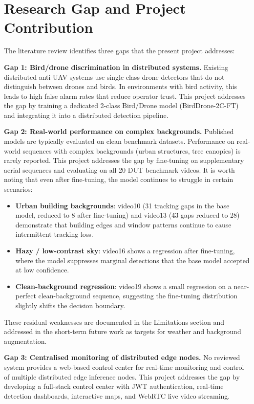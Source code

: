 \documentclass[12pt,a4paper]{report}
\begin{document}
\section{Research Gap and Project Contribution}

The literature review identifies three gaps that the present project addresses:

\textbf{Gap 1: Bird/drone discrimination in distributed systems.}
Existing distributed anti-UAV systems use single-class drone detectors
that do not distinguish between drones and birds. In environments with
bird activity, this leads to high false alarm rates that reduce operator
trust. This project addresses the gap by training a dedicated 2-class
Bird/Drone model (BirdDrone-2C-FT) and integrating it into a distributed
detection pipeline.

\textbf{Gap 2: Real-world performance on complex backgrounds.}
Published models are typically evaluated on clean benchmark datasets.
Performance on real-world sequences with complex backgrounds (urban
structures, tree canopies) is rarely reported. This project addresses
the gap by fine-tuning on supplementary aerial sequences and evaluating
on all 20 DUT benchmark videos. It is worth noting that even after
fine-tuning, the model continues to struggle in certain scenarios:
\begin{itemize}
  \item \textbf{Urban building backgrounds}: video10 (31 tracking gaps in the base model,
        reduced to 8 after fine-tuning) and video13 (43 gaps reduced to 28) demonstrate
        that building edges and window patterns continue to cause intermittent tracking loss.
  \item \textbf{Hazy / low-contrast sky}: video16 shows a regression after fine-tuning,
        where the model suppresses marginal detections that the base model accepted at low
        confidence.
  \item \textbf{Clean-background regression}: video19 shows a small regression on a
        near-perfect clean-background sequence, suggesting the fine-tuning distribution
        slightly shifts the decision boundary.
\end{itemize}
These residual weaknesses are documented in the Limitations section and addressed
in the short-term future work as targets for weather and background augmentation.

\textbf{Gap 3: Centralised monitoring of distributed edge nodes.}
No reviewed system provides a web-based control center for real-time
monitoring and control of multiple distributed edge inference nodes.
This project addresses the gap by developing a full-stack control center
with JWT authentication, real-time detection dashboards, interactive maps,
and WebRTC live video streaming.
\end{document}
